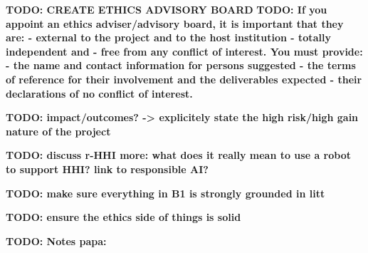 \documentclass[11pt,a4paper]{report}
\newcommand{\TODO}[1]{{\color{red}\textbf{TODO: #1}}}
\begin{document}
\newcommand{\wpTwo}{Real-world Social Situation Assessment}
\newcommand{\wpTwoShort}{Social Situation Assessment}

\newcommand{\wpThree}{Generative social behaviours}
\newcommand{\wpThreeShort}{Social behaviours}

\newcommand{\wpFour}{Goal-driven socio-cognitive architecture}
\newcommand{\wpFourShort}{Socio-cognitive architecture}


\newcommand{\wpFive}{Evidence-based research: demonstrable usefulness of social robots in
real-world, complex scenarios}
\newcommand{\wpFiveShort}{Experimental deployments}







\newrefsection


\TODO{CREATE ETHICS ADVISORY BOARD}
\TODO{If you appoint an ethics adviser/advisory board, it is important that they are:
- external to the project and to the host institution
- totally independent and
- free from any conflict of interest.
    You must provide:
- the name and contact information for persons suggested
- the terms of reference for their involvement and the deliverables expected
- their declarations of no conflict of interest.}


\TODO{impact/outcomes? -> explicitely state the high risk/high gain nature of
the project}

\TODO{discuss r-HHI more: what does it really mean to use a robot to support
HHI? link to responsible AI?}

\TODO{make sure everything in B1 is strongly grounded in litt}

\TODO{ensure the ethics side of things is solid}

\TODO{Notes papa:}
\end{document}
